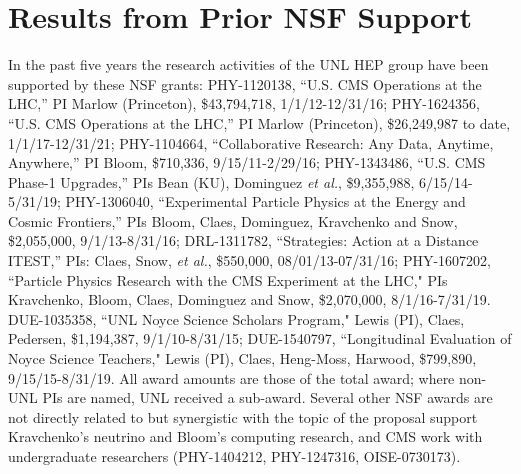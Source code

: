 \section{Results from Prior NSF Support}
\label{sec:prior}

In the past five years the research activities of the UNL HEP group have been supported by these NSF grants: 
PHY-1120138, ``U.S. CMS Operations at the LHC,'' PI Marlow (Princeton), \$43,794,718, 1/1/12-12/31/16; 
PHY-1624356, ``U.S. CMS Operations at the LHC,'' PI Marlow (Princeton), \$26,249,987 to date, 1/1/17-12/31/21; 
PHY-1104664, ``Collaborative Research: Any Data, Anytime, Anywhere,'' PI Bloom, \$710,336, 9/15/11-2/29/16;
PHY-1343486, ``U.S. CMS Phase-1 Upgrades,'' PIs Bean (KU), Dominguez {\it et al.}, \$9,355,988, 6/15/14-5/31/19;
PHY-1306040, ``Experimental Particle Physics at the Energy and Cosmic Frontiers,'' PIs Bloom, Claes, Dominguez, Kravchenko and Snow, \$2,055,000, 9/1/13-8/31/16;
DRL-1311782, ``Strategies: Action at a Distance ITEST,'' PIs: Claes, Snow, {\it et al.}, \$550,000, 08/01/13-07/31/16;
PHY-1607202, ``Particle Physics Research with the CMS Experiment at the LHC," PIs Kravchenko, Bloom, Claes, Dominguez and Snow, \$2,070,000, 8/1/16-7/31/19.
DUE-1035358, ``UNL Noyce Science Scholars Program," Lewis (PI), Claes, Pedersen, \$1,194,387, 9/1/10-8/31/15; DUE-1540797, ``Longitudinal Evaluation of Noyce Science Teachers," Lewis (PI), Claes, Heng-Moss, Harwood, \$799,890, 9/15/15-8/31/19.
All award amounts are those of the total award; where non-UNL PIs are named, UNL received a sub-award. Several other NSF awards are not directly related to but synergistic with the topic of the proposal support Kravchenko's neutrino and Bloom's computing research, and CMS work with undergraduate researchers
(PHY-1404212, PHY-1247316, OISE-0730173).

